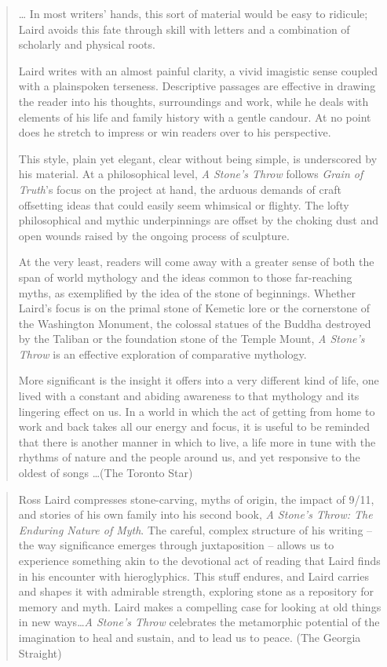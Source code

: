 \documentclass[10pt,DIV09,letterpaper,oneside,headsepline]{scrreprt}
\begin{document}
\begin{quotation}
\ldots
In most writers' hands, this sort of material would be easy to ridicule; Laird avoids this fate through skill with letters and a combination of scholarly and physical roots.

Laird writes with an almost painful clarity, a vivid imagistic sense coupled with a plainspoken terseness. Descriptive passages are effective in drawing the reader into his thoughts, surroundings and work, while he deals with elements of his life and family history with a gentle candour. At no point does he stretch to impress or win readers over to his perspective.

This style, plain yet elegant, clear without being simple, is underscored by his material. At a philosophical level, \textit{A Stone's Throw} follows \textit{Grain of Truth}'s focus on the project at hand, the arduous demands of craft offsetting ideas that could easily seem whimsical or flighty. The lofty philosophical and mythic underpinnings are offset by the choking dust and open wounds raised by the ongoing process of sculpture.

At the very least, readers will come away with a greater sense of both the span of world mythology and the ideas common to those far-reaching myths, as exemplified by the idea of the stone of beginnings. Whether Laird's focus is on the primal stone of Kemetic lore or the cornerstone of the Washington Monument, the colossal statues of the Buddha destroyed by the Taliban or the foundation stone of the Temple Mount, \textit{A Stone's Throw} is an effective exploration of comparative mythology.

More significant is the insight it offers into a very different kind of life, one lived with a constant and abiding awareness to that mythology and its lingering effect on us. In a world in which the act of getting from home to work and back takes all our energy and focus, it is useful to be reminded that there is another manner in which to live, a life more in tune with the rhythms of nature and the people around us, and yet responsive to the oldest of songs \ldots (The Toronto Star)
\end{quotation}

\begin{quotation}
Ross Laird compresses stone-carving, myths of origin, the impact of 9/11, and stories of his own family into his second book, \textit{A Stone's Throw: The Enduring Nature of Myth}. The careful, complex structure of his writing -- the way significance emerges through juxtaposition -- allows us to experience something akin to the devotional act of reading that Laird finds in his encounter with hieroglyphics. This stuff endures, and Laird carries and shapes it with admirable strength, exploring stone as a repository for memory and myth. Laird makes a compelling case for looking at old things in new ways\ldots \textit{A Stone's Throw} celebrates the metamorphic potential of the imagination to heal and sustain, and to lead us to peace. (The Georgia Straight) \end{quotation}
\end{document}
